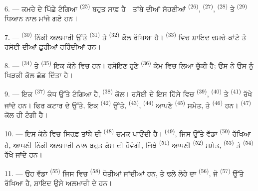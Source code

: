 \VUsaut{4.0mm}
\VUsaut{3.0mm}

6. --- ਕਮਰੇ ਦੇ ਪਿੱਛੇ ਟੰਗਿਆ  \textsuperscript{(25)} ਬਹੁਤ
ਸਾਫ਼ ਹੈ। ਤਾਂਬੇ ਦੀਆਂ ਸੋਹਣੀਆਂ  \textsuperscript{(26)},
 \textsuperscript{(27)},  \textsuperscript{(28)}
ਤੇ  \textsuperscript{(29)} ਧਿਆਨ ਨਾਲ ਮਾਂਜੇ ਗਏ ਹਨ।

7. ---  \textsuperscript{(30)} ਨਿੱਕੀ ਅਲਮਾਰੀ ਉੱਤੇ 
\textsuperscript{(31)} ਤੇ  \textsuperscript{(32)} ਕੋਲ ਰੱਖਿਆ
ਹੈ।  \textsuperscript{(33)} ਵਿਚ ਸ਼ਾਇਦ ਚਮਚੇ-ਕਾਂਟੇ ਤੇ ਰਸੋਈ ਦੀਆਂ ਛੁਰੀਆਂ
ਰਹਿੰਦੀਆਂ ਹਨ।

8. ---  \textsuperscript{(34)} ਤੇ 
\textsuperscript{(35)} ਇਕ ਕੋਨੇ ਵਿਚ ਹਨ। ਰਸੋਇਣ ਹੁਣੇ 
\textsuperscript{(36)} ਕੰਮ ਵਿਚ ਲਿਆ ਚੁੱਕੀ ਹੈ; ਉਸ ਨੇ ਉਸ ਨੂੰ ਖਿੜਕੀ ਕੋਲ ਛੱਡ ਦਿੱਤਾ ਹੈ।

9. --- ਇਕ  \textsuperscript{(37)} ਕੰਧ ਉੱਤੇ ਟੰਗਿਆ ਹੈ,
 \textsuperscript{(38)} ਕੋਲ। ਰਸੋਈ ਦੇ ਇਸ ਹਿੱਸੇ ਵਿਚ 
\textsuperscript{(39)},  \textsuperscript{(40)} ਤੇ
 \textsuperscript{(41)} ਰੱਖੇ ਜਾਂਦੇ ਹਨ। ਫਿਰ ਕਟਾਰ ਦੇ ਉੱਤੇ, ਇਕ
 \textsuperscript{(42)} ਉੱਤੇ,  \textsuperscript{(43)},
 \textsuperscript{(44)} ਆਪਣੇ 
\textsuperscript{(45)} ਸਮੇਤ, ਤੇ  \textsuperscript{(46)} ਹਨ।
 \textsuperscript{(47)} ਕੋਲ ਹੀ ਟੰਗੀ ਹੈ।

10. --- ਇਸ ਕੋਨੇ ਵਿਚ ਸਿਰਫ਼ ਤਾਂਬੇ ਦੀ  \textsuperscript{(48)} ਚਮਕ
ਪਾਉਂਦੀ ਹੈ।  \textsuperscript{(49)}, ਜਿਸ ਉੱਤੇ ਵੱਡਾ 
\textsuperscript{(50)} ਰੱਖਿਆ ਹੈ, ਆਪਣੀ ਨਿੱਕੀ ਅਲਮਾਰੀ ਨਾਲ ਬਹੁਤ ਕੰਮ ਦੀ ਹੋਵੇਗੀ, ਜਿੱਥੇ
 \textsuperscript{(51)} ਆਪਣੀ 
\textsuperscript{(52)} ਸਮੇਤ,  \textsuperscript{(53)} ਤੇ
 \textsuperscript{(54)} ਰੱਖੇ ਜਾਂਦੇ ਹਨ।

\VUsaut{4.0mm}
\VUsaut{3.0mm}

11. --- ਉਹ ਵੱਡਾ  \textsuperscript{(55)} ਜਿਸ ਵਿਚ 
\textsuperscript{(58)} ਧੋਤੀਆਂ ਜਾਂਦੀਆਂ ਹਨ, ਤੇ ਢਲੇ ਲੋਹੇ ਦਾ 
\textsuperscript{(56)}, ਜੋ  \textsuperscript{(57)} ਉੱਤੇ ਰੱਖਿਆ
ਹੈ, ਸ਼ਾਇਦ ਉਸੇ ਅਲਮਾਰੀ ਦੇ ਹਨ।

